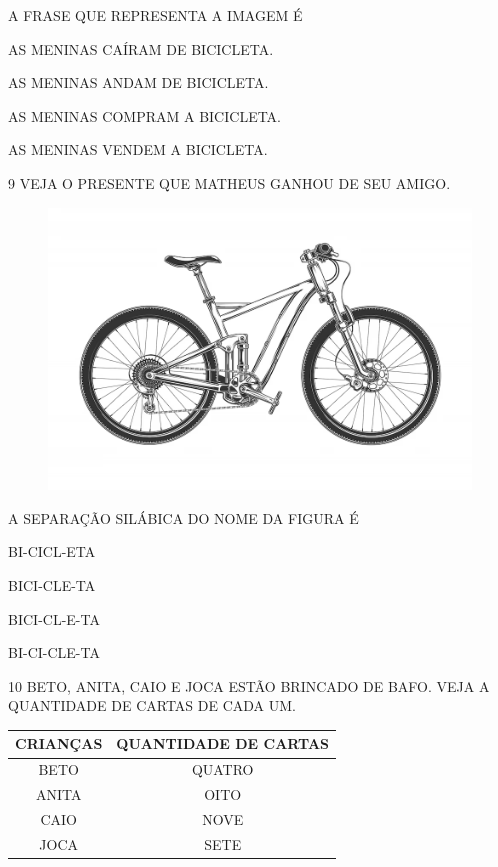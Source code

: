A FRASE QUE REPRESENTA A IMAGEM É

\begin{escolha}

\item AS MENINAS CAÍRAM DE BICICLETA.

\item AS MENINAS ANDAM DE BICICLETA.

\item AS MENINAS COMPRAM A BICICLETA.

\item AS MENINAS VENDEM A BICICLETA.

\end{escolha}

\num{9} VEJA O PRESENTE QUE MATHEUS GANHOU DE SEU AMIGO.

\begin{figure}[H]
\centering
\includegraphics[width=.7\textwidth]{./media/image242.png}
\end{figure}

\pagebreak
A SEPARAÇÃO SILÁBICA DO NOME DA FIGURA É

\begin{escolha}

\item BI-CICL-ETA

\item BICI-CLE-TA

\item BICI-CL-E-TA

\item BI-CI-CLE-TA

\end{escolha}

\num{10} BETO, ANITA, CAIO E JOCA ESTÃO BRINCADO DE BAFO.
VEJA A QUANTIDADE DE CARTAS DE CADA UM.

\begin{table}[H]
\centering
\begin{tabular}{|c|c|}
\hline
\textbf{CRIANÇAS} & \textbf{QUANTIDADE DE CARTAS} \\ \hline
BETO              & QUATRO                        \\ \hline
ANITA             & OITO                          \\ \hline
CAIO              & NOVE                          \\ \hline
JOCA              & SETE                          \\ \hline
\end{tabular}
\end{table}

